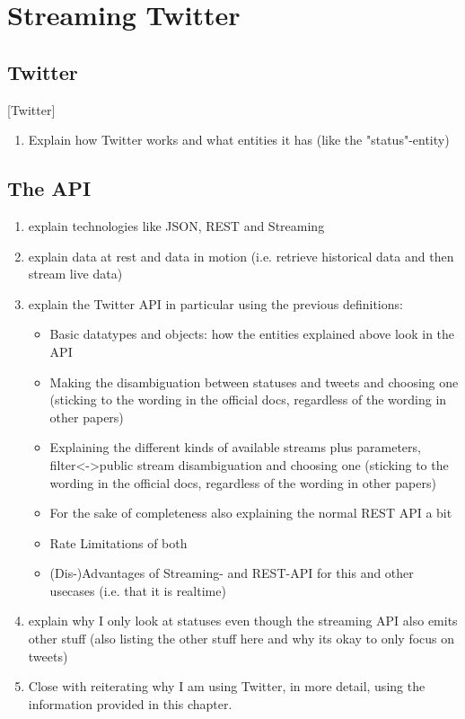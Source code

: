 \chapter{Streaming Twitter}
\label{ch:twitterStreaming}

\section{Twitter}[Twitter]
\label{sec:twitter}

\begin{enumerate}
    \item
    Explain how Twitter works and what entities it has (like the "status"-entity)
\end{enumerate}

\section{The API}
\label{sec:theApi}

\begin{enumerate}
    \item
    explain technologies like JSON, REST and Streaming
    \item
    explain data at rest and data in motion (i.e. retrieve historical data and then stream live data)
    \item
    explain the Twitter API in particular using the previous definitions:
    \begin{itemize}
        \item
        Basic datatypes and objects: how the entities explained above look in the API
        \item
        Making the disambiguation between statuses and tweets and choosing one (sticking to the wording in the official docs, regardless of the wording in other papers)
        \item
        Explaining the different kinds of available streams plus parameters, filter<->public stream disambiguation and choosing one (sticking to the wording in the official docs, regardless of the wording in other papers)
        \item
        For the sake of completeness also explaining the normal REST API a bit
        \item
        Rate Limitations of both
        \item
        (Dis-)Advantages of Streaming- and REST-API for this and other usecases (i.e. that it is realtime)
    \end{itemize}
    \item
    explain why I only look at statuses even though the streaming API also emits other stuff (also listing the other stuff here and why its okay to only focus on tweets)
    \item
    Close with reiterating why I am using Twitter, in more detail, using the information provided in this chapter.
\end{enumerate}

